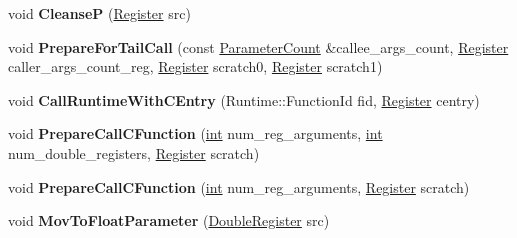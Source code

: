 \begin{DoxyCompactItemize}
\item 
\mbox{\label{classv8_1_1internal_1_1TurboAssembler_a248b26b0e8aaf641763bf1b55995833f}} 
void {\bfseries CleanseP} (\mbox{\hyperlink{classv8_1_1internal_1_1Register}{Register}} src)
\item 
\mbox{\label{classv8_1_1internal_1_1TurboAssembler_a39e544d96166c4b553cc204fae211b68}} 
void {\bfseries Prepare\+For\+Tail\+Call} (const \mbox{\hyperlink{classv8_1_1internal_1_1ParameterCount}{Parameter\+Count}} \&callee\+\_\+args\+\_\+count, \mbox{\hyperlink{classv8_1_1internal_1_1Register}{Register}} caller\+\_\+args\+\_\+count\+\_\+reg, \mbox{\hyperlink{classv8_1_1internal_1_1Register}{Register}} scratch0, \mbox{\hyperlink{classv8_1_1internal_1_1Register}{Register}} scratch1)
\item 
\mbox{\label{classv8_1_1internal_1_1TurboAssembler_a402a6ba1a950da97bcbbf500be586951}} 
void {\bfseries Call\+Runtime\+With\+C\+Entry} (Runtime\+::\+Function\+Id fid, \mbox{\hyperlink{classv8_1_1internal_1_1Register}{Register}} centry)
\item 
\mbox{\label{classv8_1_1internal_1_1TurboAssembler_ae111d12378cf9e12ef461e60a89f92e5}} 
void {\bfseries Prepare\+Call\+C\+Function} (\mbox{\hyperlink{classint}{int}} num\+\_\+reg\+\_\+arguments, \mbox{\hyperlink{classint}{int}} num\+\_\+double\+\_\+registers, \mbox{\hyperlink{classv8_1_1internal_1_1Register}{Register}} scratch)
\item 
\mbox{\label{classv8_1_1internal_1_1TurboAssembler_a55daccc2d27652f14c3a86b5109aa102}} 
void {\bfseries Prepare\+Call\+C\+Function} (\mbox{\hyperlink{classint}{int}} num\+\_\+reg\+\_\+arguments, \mbox{\hyperlink{classv8_1_1internal_1_1Register}{Register}} scratch)
\item 
\mbox{\label{classv8_1_1internal_1_1TurboAssembler_ac49113791072985f3f489c24bb208c35}} 
void {\bfseries Mov\+To\+Float\+Parameter} (\mbox{\hyperlink{classv8_1_1internal_1_1DoubleRegister}{Double\+Register}} src)
\item 
\mbox{\label{classv8_1_1internal_1_1TurboAssembler_afe7fc2fe9aaf078764f1eadf12fe8d79}} 

\end{DoxyCompactItemize}
